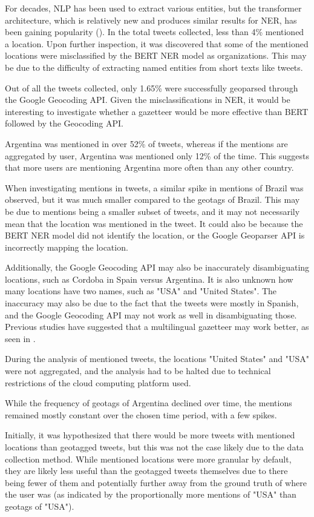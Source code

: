 For decades, NLP has been used to extract various entities, but the transformer architecture, which is relatively new and produces similar results for NER, has been gaining popularity (\cite{vaswani_attention_2017}). In the total tweets collected, less than 4\% mentioned a location. Upon further inspection, it was discovered that some of the mentioned locations were misclassified by the BERT NER model as organizations. This may be due to the difficulty of extracting named entities from short texts like tweets.

Out of all the tweets collected, only 1.65\% were successfully geoparsed through the Google Geocoding API. Given the misclassifications in NER, it would be interesting to investigate whether a gazetteer would be more effective than BERT followed by the Geocoding API.

Argentina was mentioned in over 52\% of tweets, whereas if the mentions are aggregated by user, Argentina was mentioned only 12\% of the time. This suggests that more users are mentioning Argentina more often than any other country.

When investigating mentions in tweets, a similar spike in mentions of Brazil was observed, but it was much smaller compared to the geotags of Brazil. This may be due to mentions being a smaller subset of tweets, and it may not necessarily mean that the location was mentioned in the tweet. It could also be because the BERT NER model did not identify the location, or the Google Geoparser API is incorrectly mapping the location.

Additionally, the Google Geocoding API may also be inaccurately disambiguating locations, such as Cordoba in Spain versus Argentina. It is also unknown how many locations have two names, such as "USA" and "United States". The inaccuracy may also be due to the fact that the tweets were mostly in Spanish, and the Google Geocoding API may not work as well in disambiguating those. Previous studies have suggested that a multilingual gazetteer may work better, as seen in \cite{wang_enhancing_2019}.

During the analysis of mentioned tweets, the locations "United States" and "USA" were not aggregated, and the analysis had to be halted due to technical restrictions of the cloud computing platform used.

While the frequency of geotags of Argentina declined over time, the mentions remained mostly constant over the chosen time period, with a few spikes.

Initially, it was hypothesized that there would be more tweets with mentioned locations than geotagged tweets, but this was not the case likely due to the data collection method. While mentioned locations were more granular by default, they are likely less useful than the geotagged tweets themselves due to there being fewer of them and potentially further away from the ground truth of where the user was (as indicated by the proportionally more mentions of "USA" than geotags of "USA").

